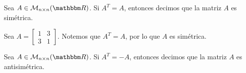 \begin{definition}
    Sea $A \in \mathcal{M}_{n \times n}(\RR)$. Si $A^T = A$, entonces decimos que la matriz $A$ es simétrica.
\end{definition}

\newpage

\begin{example}
    Sea $A = \begin{bmatrix}
        1 & 3 \\
        3 & 1
    \end{bmatrix}$. Notemos que $A^T = A$, por lo que $A$ es simétrica.
\end{example}

\begin{definition}\label{matriz-antisimetrica}
    Sea $A \in \mathcal{M}_{n \times n}(\RR)$. Si $A^T = -A$, entonces decimos que la matriz $A$ es antisimétrica.
\end{definition}

